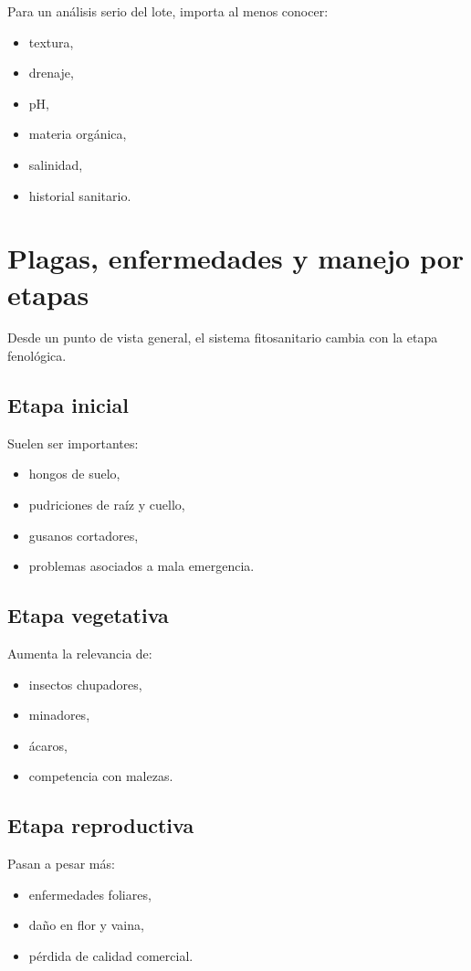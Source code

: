 \documentclass[11pt,a4paper]{article}
\begin{document}
Para un análisis serio del lote, importa al menos conocer:
\begin{itemize}[leftmargin=1.5em]
    \item textura,
    \item drenaje,
    \item pH,
    \item materia orgánica,
    \item salinidad,
    \item historial sanitario.
\end{itemize}

\section{Plagas, enfermedades y manejo por etapas}

Desde un punto de vista general, el sistema fitosanitario cambia con la etapa fenológica.

\subsection*{Etapa inicial}
Suelen ser importantes:
\begin{itemize}[leftmargin=1.5em]
    \item hongos de suelo,
    \item pudriciones de raíz y cuello,
    \item gusanos cortadores,
    \item problemas asociados a mala emergencia.
\end{itemize}

\subsection*{Etapa vegetativa}
Aumenta la relevancia de:
\begin{itemize}[leftmargin=1.5em]
    \item insectos chupadores,
    \item minadores,
    \item ácaros,
    \item competencia con malezas.
\end{itemize}

\subsection*{Etapa reproductiva}
Pasan a pesar más:
\begin{itemize}[leftmargin=1.5em]
    \item enfermedades foliares,
    \item daño en flor y vaina,
    \item pérdida de calidad comercial.
\end{itemize}
\end{document}
